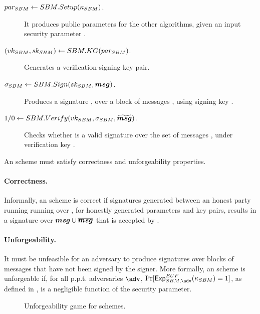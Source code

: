 \begin{description}
\item[$par_{SBM} \gets SBM.Setup(\kappa_{SBM})$.] It produces public parameters
  for the other algorithms, given an input security parameter \SBMsecpar.
\item[$(vk_{SBM},sk_{SBM}) \gets SBM.KG(par_{SBM})$.] Generates a
  verification-signing key pair.
\item[$\sigma_{SBM} \gets SBM.Sign(sk_{SBM},\boldsymbol{msg})$.] Produces a signature \sig, over
  a block of messages \smsg, using signing key \SBMsk.
\item[$1/0 \gets SBM.Verify(vk_{SBM},\sigma_{SBM},\widetilde{\boldsymbol{msg}})$.] Checks
  whether \SBMsig is a valid signature over the set of messages \smsg, under
  verification key \SBMvk.
\end{description}

An \SBM scheme must satisfy correctness and unforgeability properties.

\paragraph{Correctness.} %
Informally, an \SBM scheme is correct if signatures generated between an honest
party running running \SBMSign over \smsg, for honestly generated parameters
and key pairs, results in a signature over $\boldsymbol{msg} \cup \overline{\boldsymbol{msg}}$ that is
accepted by \SBMVerify.

\paragraph{Unforgeability.} %
It must be unfeasible for an adversary to produce signatures over blocks of
messages that have not been signed by the signer. More formally, an \SBM scheme
is unforgeable if, for all p.p.t. adversaries $\adv$, $\Pr[\ExpSBMEUF
(\SBMsecpar) = 1]$, as defined in , is a negligible
function of the security parameter. 

\begin{figure}[ht!]
  \label{fig:sbm-games}
  \caption{Unforgeability game for \SBM schemes.}
\end{figure}
\fi

